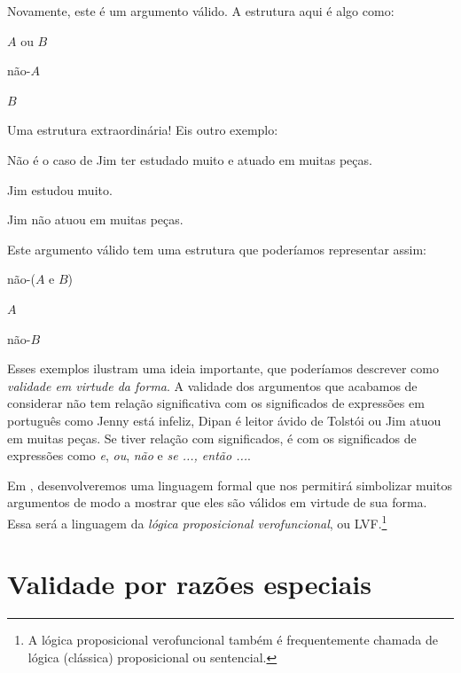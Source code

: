 Novamente, este é um argumento válido. A estrutura aqui é algo como:
	\begin{earg}
		\item[] $A$ ou $B$
		\item[] não-$A$
		\item[\texttherefore] $B$
	\end{earg}
Uma estrutura extraordinária! Eis outro exemplo:
	\begin{earg}
		\item[] Não é o caso de Jim ter estudado muito e atuado em muitas peças.
		\item[] Jim estudou muito.
		\item[\texttherefore] Jim não atuou em muitas peças.
	\end{earg}
Este argumento válido tem uma estrutura que poderíamos representar assim:
	\begin{earg}
		\item[] não-($A$ e $B$)
		\item[] $A$
		\item[\texttherefore] não-$B$
	\end{earg}
Esses exemplos ilustram uma ideia importante, que poderíamos descrever como \emph{validade em virtude da forma}. A validade dos argumentos que acabamos de considerar não tem relação significativa com os significados de expressões em português como Jenny está infeliz, Dipan é leitor ávido de Tolstói ou Jim atuou em muitas peças. Se tiver relação com significados, é com os significados de expressões como \emph{e}, \emph{ou}, \emph{não} e \emph{se ..., então ...}.
 
Em , desenvolveremos uma
linguagem formal que nos permitirá simbolizar muitos argumentos de modo a
mostrar que eles são válidos em virtude de sua forma. Essa será a
linguagem da \emph{lógica proposicional verofuncional}, ou
LVF.\footnote{A lógica proposicional verofuncional também é frequentemente chamada de lógica (clássica) proposicional ou sentencial.}

\section{Validade por razões especiais}

